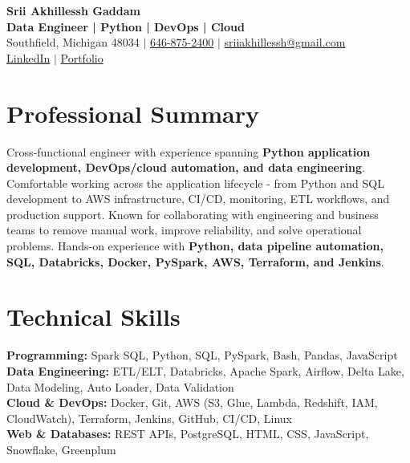 \documentclass[letterpaper,10pt]{article}
\begin{document}
\fontsize{9.35pt}{10.45pt}\selectfont

\begin{center}
    {\LARGE \textbf{Srii Akhillessh Gaddam}} \\[-1pt]
    \textbf{Data Engineer | Python | DevOps | Cloud} \\[2pt]
    Southfield, Michigan 48034 $|$
    \href{tel:6468752400}{646-875-2400} $|$
    \href{mailto:sriiakhillessh@gmail.com}{sriiakhillessh@gmail.com} \\[1pt]
    \href{https://www.linkedin.com/in/srii-akhiilessh-gaddam-b48668191/}{LinkedIn} $|$
    \href{https://sriiakhillesshg.github.io/portfolio/}{Portfolio}
\end{center}
\vspace{-8pt}

\section{Professional Summary}
\small{Cross-functional engineer with experience spanning \textbf{Python application development, DevOps/cloud automation, and data engineering}. Comfortable working across the application lifecycle - from Python and SQL development to AWS infrastructure, CI/CD, monitoring, ETL workflows, and production support. Known for collaborating with engineering and business teams to remove manual work, improve reliability, and solve operational problems. Hands-on experience with \textbf{Python, data pipeline automation, SQL, Databricks, Docker, PySpark, AWS, Terraform, and Jenkins}.}

\section{Technical Skills}
\small{
\textbf{Programming:} Spark SQL, Python, SQL, PySpark, Bash, Pandas, JavaScript \\
\textbf{Data Engineering:} ETL/ELT, Databricks, Apache Spark, Airflow, Delta Lake, Data Modeling, Auto Loader, Data Validation \\
\textbf{Cloud \& DevOps:} Docker, Git, AWS (S3, Glue, Lambda, Redshift, IAM, CloudWatch), Terraform, Jenkins, GitHub, CI/CD, Linux \\
\textbf{Web \& Databases:} REST APIs, PostgreSQL, HTML, CSS, JavaScript, Snowflake, Greenplum
}

\end{document}
